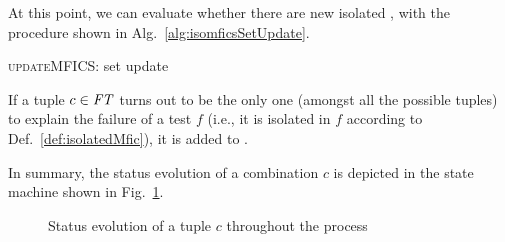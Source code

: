 \begin{tikzborder}{\cite{Gargantini16:validation}}
\begin{tikzborder}{\cite{gargantini_combinatorial_2017}}
\begin{tikzborder}{\cite{garn2019}}
\begin{tikzborder}{\cite{arcaini2019achieving}}
\begin{tikzborder}{}
At this point, we can evaluate whether there are new isolated \mfics, with the procedure shown in Alg.~\ref{alg:isomficsSetUpdate}.
\end{tikzborder}
%
\begin{algorithm}[!htb]
	\begin{algorithmic}[1]
		
		\EndIf
		\EndFor
	\end{algorithmic}
	\caption{\textsc{updateMFICS}: \isoMficsSet set update}
	\label{alg:isomficsSetUpdate}
\end{algorithm}
%
\begin{tikzborder}{}
If a tuple $c \in \mathit{FT}$ turns out to be the only one (amongst all the possible tuples) to explain the failure of a test $f$ (i.e., it is isolated in $f$ according to Def.~\ref{def:isolatedMfic}), it is added to \isoMficsSet.

In summary, the status evolution of a combination $c$ is depicted in the state machine shown in Fig.~\ref{fig:tupleLifeCycle}.
\end{tikzborder}
%
\begin{figure}[!htb]
	\centering
	\vspace{-50pt}
	\caption{Status evolution of a tuple $c$ throughout the process}
	\label{fig:tupleLifeCycle}
\end{figure}



\end{tikzborder}
\end{tikzborder}
\end{tikzborder}
\end{tikzborder}
